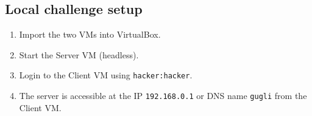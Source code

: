 \documentclass[11pt, a4paper]{article}
\begin{document}
\subsection{Local challenge setup}

\begin{enumerate}
    \item Import the two VMs into VirtualBox.
    \item Start the Server VM (headless).
    \item Login to the Client VM using \texttt{hacker:hacker}.
    \item The server is accessible at the IP \texttt{192.168.0.1} or DNS name \texttt{gugli}
    from the Client VM.
\end{enumerate}


\end{document}
